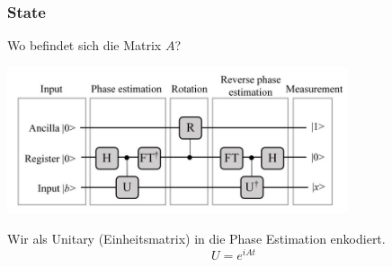 \begin{frame}
    \frametitle{State }
    \hfil

    Wo befindet sich die Matrix $A$?
    \begin{center}
    \includegraphics[width=10cm]{img/hhl_circuit.jpg}
    \end{center}

    \hfil
    Wir als Unitary (Einheitsmatrix) in die Phase Estimation enkodiert.
    $$U = e^{iAt}$$
\end{frame}


